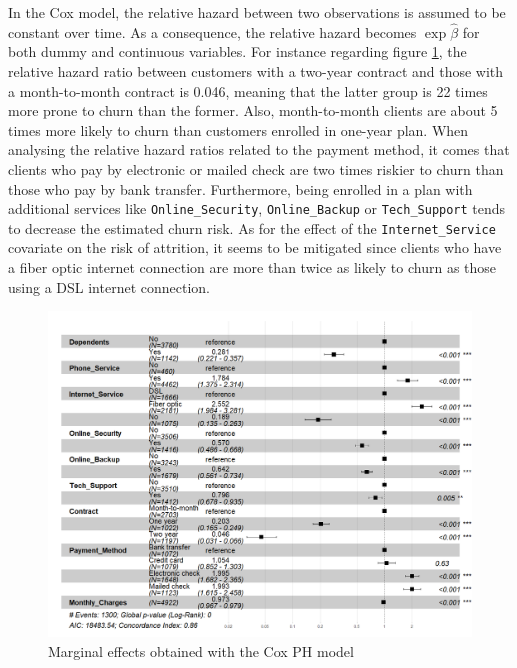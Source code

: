 \documentclass[
]{book}
\begin{document}
In the Cox model, the relative hazard between two observations is assumed to be constant over time. As a consequence, the relative hazard becomes \(\exp \hat{\beta}\) for both dummy and continuous variables. For instance regarding figure \ref{fig:coxmarginaleffects}, the relative hazard ratio between customers with a two-year contract and those with a month-to-month contract is 0.046, meaning that the latter group is 22 times more prone to churn than the former. Also, month-to-month clients are about 5 times more likely to churn than customers enrolled in one-year plan. When analysing the relative hazard ratios related to the payment method, it comes that clients who pay by electronic or mailed check are two times riskier to churn than those who pay by bank transfer. Furthermore, being enrolled in a plan with additional services like \texttt{Online\_Security}, \texttt{Online\_Backup} or \texttt{Tech\_Support} tends to decrease the estimated churn risk. As for the effect of the \texttt{Internet\_Service} covariate on the risk of attrition, it seems to be mitigated since clients who have a fiber optic internet connection are more than twice as likely to churn as those using a DSL internet connection.

\begin{figure}

{\centering \includegraphics[width=18.06in]{./imgs/cox_ggforest} 

}

\caption{Marginal effects obtained with the Cox PH model}\label{fig:coxmarginaleffects}
\end{figure}
\end{document}
